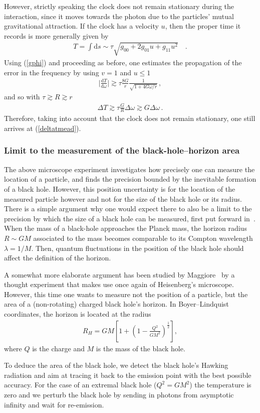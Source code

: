 \documentclass{article}
\def\beqn{\begin{eqnarray}}
\def\eeqn{\end{eqnarray}}
\begin{document}
However, strictly speaking the clock does not remain stationary during the interaction, since it
moves towards the photon due to the particles' mutual gravitational attraction. If the clock has a velocity $u$, then
the proper time it records is more generally given by
\beqn
T = \int \mathrm{d}s \sim \tau \sqrt{g_{00} + 2g_{01}u + g_{11}u^2} \quad .
\eeqn
Using (\ref{gphi}) and proceeding as before, one estimates the propagation of the error in the frequency by using $v=1$ and $u\leq 1$ 
\beqn
\Big| \frac{\mathrm{d}T}{\mathrm{d}\omega} \Big| \gtrsim \tau \frac{8G}{r} \frac{1}{\sqrt{1 + 4G\omega/r}} \,,
\eeqn
and so with $\tau \gtrsim R \gtrsim r$
\beqn
\Delta T \gtrsim \tau \frac{G}{R} \Delta \omega \gtrsim  G \Delta \omega \,.
\eeqn
Therefore, taking into account that the clock does not remain stationary, one still arrives at (\ref{deltatmead}). 


\subsubsection{Limit to the measurement of the black-hole--horizon area}

The above microscope experiment investigates how precisely one can measure the location of a
particle, and finds the precision bounded by the inevitable formation of a black hole. 
However, this position uncertainty
is for the location of the measured particle however and not for the size of the black hole or 
its radius.
There is a simple argument why one would expect there to also be a limit to the precision
by which the size of a black hole can be measured, first put forward in~\cite{Wilczek}. 
When the mass of a black-hole approaches the Planck mass, the horizon radius $R \sim G M$ associated
to the mass becomes
comparable to its Compton wavelength $\lambda = 1/M$. Then, quantum fluctuations in the position of the
black hole should affect the definition of the horizon.

A somewhat more elaborate argument has been studied by Maggiore~\cite{Maggiore} by a thought
experiment that makes use once again of Heisenberg's microscope. However, this time
one wants to measure not the position of a particle, but the area of a (non-rotating) charged black hole's
horizon. In Boyer--Lindquist coordinates, the horizon is located at the radius
\beqn
R_H = GM \left[ 1 + \left(1 - \frac{Q^2}{GM^2} \right)^\frac{1}{2}\right] , \label{reissner}
\eeqn
where $Q$ is the charge and $M$ is the mass of the black hole.

To deduce the area of the black hole, we detect the black hole's Hawking radiation and aim
at tracing it back to the emission point with the best possible accuracy. 
For the case of an extremal black hole ($Q^2 = GM^2$) the temperature is zero and we
perturb the black hole by sending in photons from asymptotic infinity and wait for
re-emission. 
\end{document}
